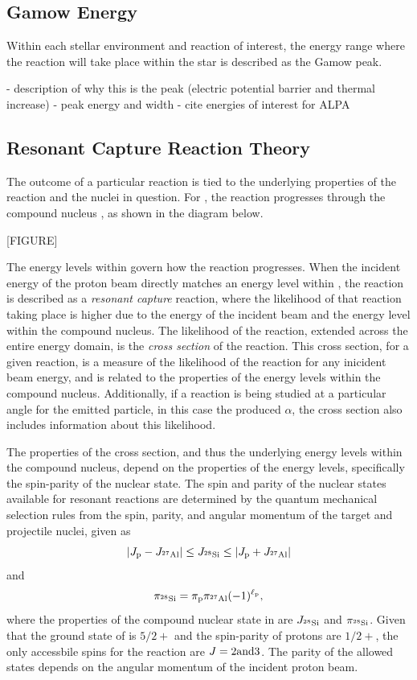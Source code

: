 \subsection{Gamow Energy}

Within each stellar environment and reaction of interest, the energy range
where the reaction will take place within the star is described as the Gamow
peak.

- description of why this is the peak (electric potential barrier and thermal increase)
- peak energy and width
- cite energies of interest for ALPA

\subsection{Resonant Capture Reaction Theory}

The outcome of a particular reaction is tied to the underlying properties of
the reaction and the nuclei in question. For \alpa{}, the reaction progresses
through the compound nucleus , as shown in the diagram below.

[FIGURE]

The energy levels within  govern how the reaction progresses. When
the incident energy of the proton beam directly matches an energy level within
, the reaction is described as a \emph{resonant capture} reaction,
where the likelihood of that reaction taking place is higher due to the energy
of the incident beam and the energy level within the compound nucleus. The
likelihood of the reaction, extended across the entire energy domain, is the
\emph{cross section} of the reaction. This cross section, for a given reaction,
is a measure of the likelihood of the reaction for any inicident beam energy,
and is related to the properties of the energy levels within the compound
nucleus. Additionally, if a reaction is being studied at a particular angle for
the emitted particle, in this case the produced $\alpha$, the cross section
also includes information about this likelihood.

The properties of the cross section, and thus the underlying energy levels
within the compound nucleus, depend on the properties of the energy levels,
specifically the spin-parity of the nuclear state. The spin and parity of the
nuclear states available for resonant reactions are determined by the quantum
mechanical selection rules from the spin, parity, and angular momentum of the
target and projectile nuclei, given as
\[
    \left|J_{\rm{p}} - J_{{}^{27}\textrm{Al}}\right|
    \leq J_{{}^{28}\textrm{Si}} \leq
    \left|J_{\rm{p}} + J_{{}^{27}\textrm{Al}}\right|
\]
and
\[
    \pi_{{}^{28}\textrm{Si}} = \pi_{\rm{p}}\pi_{{}^{27}\textrm{Al}}(-1)^{\ell_{\rm{p}}},
\]
where the properties of the compound nuclear state in  are
$J_{{}^{28}\textrm{Si}}$ and $\pi_{{}^{28}\textrm{Si}}$. Given that the ground state of
 is $5/2+$ and the spin-parity of protons are $1/2+$, the only
accessbile spins for the reaction are $J = 2\rm{ and }3$. The parity of the
allowed states depends on the angular momentum of the incident proton beam.

